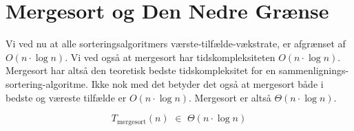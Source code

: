 \section{Mergesort og Den Nedre Grænse}
\label{sec:Mergesort og Den Nedre Grænse}

Vi ved nu at alle sorteringsalgoritmers værste-tilfælde-vækstrate, er afgrænset af $O(n \cdot \log n)$. Vi ved også at mergesort har tidskompleksiteten $O (n \cdot \log n)$. Mergesort har altså den teoretisk bedste tidskompleksitet for en sammenlignings-sortering-algoritme. Ikke nok med det betyder det også at mergesort både i bedste og væreste tilfælde er $O(n \cdot \log n)$. Mergesort er altså $\Theta (n \cdot \log n)$.


$$T_{\text{mergesort}}(n) \,\,\in\,\, \Theta (n \cdot \log n)$$






